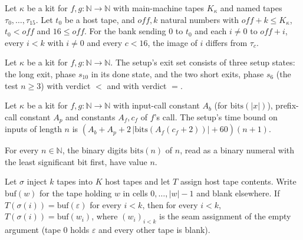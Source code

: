 \begin{theorem}
\label{Turing.NTimeDiag.qyBank_ne_tp}
\leanok
{}
Let $\kappa$ be a kit for $f, g : \mathbb{N} \to \mathbb{N}$ with main-machine tapes $K_\kappa$ and
named tapes $\tau_0, \dots, \tau_{15}$. Let $t_0$ be a host tape, and $\mathit{off}, k$ natural
numbers with $\mathit{off} + k \le K_\kappa$, $t_0 < \mathit{off}$ and $16 \le \mathit{off}$.
For the bank sending $0$ to $t_0$ and each $i \ne 0$ to $\mathit{off} + i$, every $i < k$ with
$i \ne 0$ and every $c < 16$, the image of $i$ differs from $\tau_c$.
\end{theorem}

\begin{definition}
\label{Turing.NTimeDiag.qySetF}
\leanok
{}
Let $\kappa$ be a kit for $f, g : \mathbb{N} \to \mathbb{N}$. The setup's exit set consists of three
setup states: the long exit, phase $s_{10}$ in its done state, and the two short exits, phase $s_6$
(the test $n \ge 3$) with verdict $<$ and with verdict $=$.
\end{definition}

\begin{definition}
\label{Turing.NTimeDiag.qySetB}
\leanok
{}
Let $\kappa$ be a kit for $f, g : \mathbb{N} \to \mathbb{N}$ with input-call constant $A_b$ (for
$\mathrm{bits}(|x|)$), prefix-call constant $A_p$ and constants $A_f, c_f$ of $f$'s call. The
setup's time bound on inputs of length $n$ is
$(A_b + A_p + 2\,|\mathrm{bits}(A_f(c_f + 2))| + 60)(n + 1)$.
\end{definition}

\begin{theorem}
\label{Turing.NTimeDiag.qy_bits_val}
\leanok
{}
For every $n \in \mathbb{N}$, the binary digits $\mathrm{bits}(n)$ of $n$, read as a binary numeral
with the least significant bit first, have value $n$.
\end{theorem}

\begin{theorem}
\label{Turing.NTimeDiag.qy_blank_bank}
\leanok
{}
Let $\sigma$ inject $k$ tapes into $K$ host tapes and let $T$ assign host tape contents. Write
$\mathrm{buf}(w)$ for the tape holding $w$ in cells $0, \dots, |w| - 1$ and blank elsewhere. If
$T(\sigma(i)) = \mathrm{buf}(\varepsilon)$ for every $i < k$, then for every $i < k$,
$T(\sigma(i)) = \mathrm{buf}(w_i)$, where $(w_i)_{i<k}$ is the seam assignment of the empty argument
(tape $0$ holds $\varepsilon$ and every other tape is blank).
\end{theorem}

